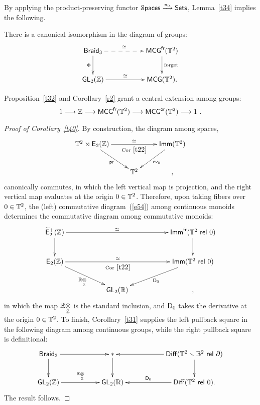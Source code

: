 By applying the product-preserving functor $\operatorname{\mathcal S\mathsf{paces}} \xrightarrow{\pi_0} {\sf Sets}$, Lemma~\ref{t34} implies the following.
\begin{cor}\label{r2}
There is a canonical isomorphism in the diagram of groups:
\[
\xymatrix{
\Braid
\ar@{-->}[rr]^-{\cong}
\ar[d]_-{\Phi}
&&
{\sf MCG}^{\sf fr}(\TT^2)
\ar[d]^-{\rm forget}
\\
\GL_2(\ZZ)
\ar[rr]^-{\cong}
&&
{\sf MCG}(\TT^2)
.
}
\]


\end{cor}



\begin{remark}\label{r1}
Proposition~\ref{t32} and Corollary~\ref{r2} grant a central extension among groups:
\[
1
\longrightarrow
\mathbb Z
\longrightarrow
{\sf MCG}^{\operatorname{\sf fr}}(\mathbb T^2)
\longrightarrow
{\sf MCG}^{\sf or}(\mathbb T^2)
\longrightarrow
1
~.
\\
\]

\end{remark}







\begin{proof}[Proof of Corollary~\ref{t40}]
By construction, the diagram among spaces,
\[
\xymatrix{
\TT^2 \rtimes \EZ
\ar[rr]^-{\simeq}_-{\rm Cor~\ref{t22}}
\ar[dr]_-{\pr}
&&
\Imm(\TT^2)
\ar[dl]^-{\ev_0}
\\
&
\TT^2
&
,
}
\]
canonically commutes, in which the left vertical map is projection, and the right vertical map evaluates at the origin $0\in \mathbb T^2$.  
Therefore, upon taking fibers over $0\in \mathbb T^2$, the (left) commutative diagram~(\ref{e54}) among continuous monoids determines the commutative diagram among commutative monoids:
\begin{equation*}
\xymatrix{
\Ebraid
\ar[rrrr]^-{\simeq}
\ar[d]
&&
&&
\Imm^{\fr}(\TT^2 ~{\sf rel } ~0)
\ar[d]
\\
\EZ
\ar[rrrr]^-{\simeq}_-{\rm Cor~\ref{t22}}
\ar[drr]_-{\RR \underset{\ZZ}\ot}
&&
&&
\Imm(\TT^2 ~{\sf rel } ~0)
\ar[dll]^-{\sD_0}
\\
&&
\GL_2(\RR)
&&
,
}
\end{equation*}
in which the map $\mathbb R \underset{\mathbb Z}{\otimes} $ is the standard inclusion, and $\mathsf D_0$ takes the derivative at the origin $0\in \mathbb T^2$.
To finish, Corollary~\ref{t31} supplies the left pullback square in the following diagram among continuous groups, while the right pullback square is definitional:
\[
\xymatrix{
\Braid
\ar[rr]
\ar[d]
&&
\ast
\ar[d]
&&
\Diff(\TT^2 \smallsetminus \BB^2 ~{\sf rel}~\partial )
\ar[ll]
\ar[d]
\\
\GL_2(\ZZ)
\ar[rr]^-{\RR \underset{\ZZ}\ot}
&&
\GL_2(\RR)
&&
\Diff(\TT^2~{\sf rel}~0)
\ar[ll]_-{\sD_0}
.
}
\]
The result follows. 

\end{proof}




